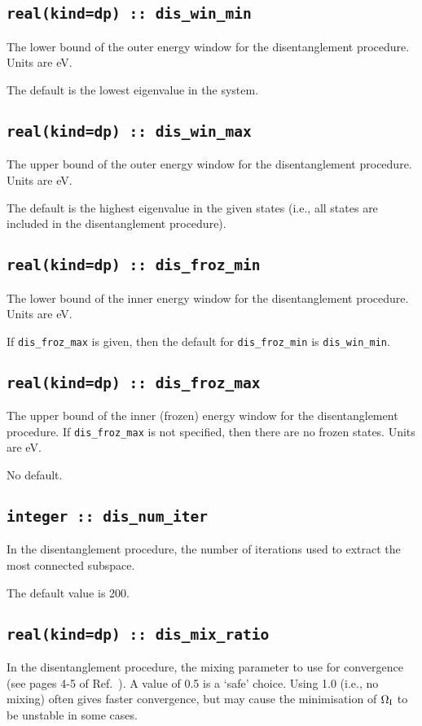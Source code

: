 \subsection[dis\_win\_min]{\tt real(kind=dp) :: dis\_win\_min}
The lower bound of the outer energy window for the disentanglement
procedure. Units are eV.

The default is the lowest eigenvalue in the system.

\subsection[dis\_win\_max]{\tt real(kind=dp) :: dis\_win\_max}
The upper bound of the outer energy window for the disentanglement
procedure. Units are eV.

The default is the highest eigenvalue in the given states (i.e., all states
are included in the disentanglement procedure).

\subsection[dis\_froz\_min]{\tt real(kind=dp) :: dis\_froz\_min}
The lower bound of the inner energy window for the disentanglement
procedure.  Units are eV.

If \verb#dis_froz_max# is given, then the default for 
\verb#dis_froz_min# is \verb#dis_win_min#.


\subsection[dis\_froz\_max]{\tt real(kind=dp) :: dis\_froz\_max}
The upper bound of the inner (frozen) energy window for the
disentanglement procedure. If \verb#dis_froz_max# is not specified,
then there are no frozen states. Units are eV.

No default.

\subsection[dis\_num\_iter]{\tt integer :: dis\_num\_iter}
In the disentanglement procedure, the
number of iterations used to extract the most connected subspace.

The default value is 200.

\subsection[dis\_mix\_ratio]{\tt real(kind=dp) :: dis\_mix\_ratio}
In the disentanglement procedure, the mixing parameter to use for
convergence (see pages 4-5 of Ref.~\cite{souza-prb01}). A value of 0.5
is a `safe' choice. Using 1.0 (i.e., no mixing) often gives faster
convergence, but may cause the minimisation of $\Omega_{\mathrm{I}}$ to be unstable
in some cases.

